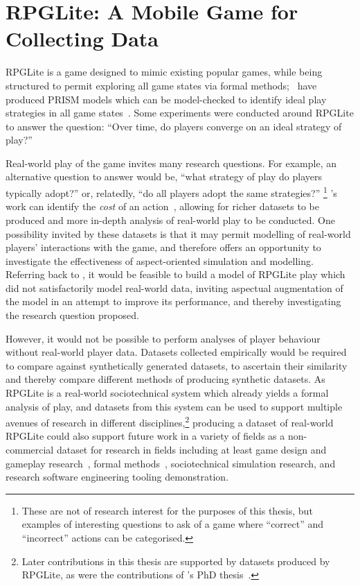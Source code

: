 \chapter{RPGLite: A Mobile Game for Collecting Data}

RPGLite is a game designed to mimic existing popular games, while being
structured to permit exploring all game states via formal methods;
\citeauthor{kavanagh2020}~have produced PRISM models which can be model-checked
to identify ideal play strategies in all game states~\cite{kavanagh2020}. Some
experiments were conducted around RPGLite to answer the question: ``Over time,
do players converge on an ideal strategy of play?''

Real-world play of the game invites many research questions. For example, an
alternative question to answer would be, ``what strategy of play do players
typically adopt?'' or, relatedly, ``do all players adopt the same strategies?''
\footnote{These are not of research interest for the purposes of this thesis,
but examples of interesting questions to ask of a game where ``correct'' and
``incorrect'' actions can be categorised.} \citeauthor{kavanagh2020}'s work can
identify the \emph{cost} of an action~\cite{kavanagh2020,kavanagh2021thesis},
allowing for richer datasets to be produced and more in-depth analysis of
real-world play to be conducted. One possibility invited by these datasets is
that it may permit modelling of real-world players' interactions with the game,
and therefore offers an opportunity to investigate the effectiveness of
aspect-oriented simulation and modelling. Referring back to , it would be feasible to build a model of RPGLite play
which did not satisfactorily model real-world data, inviting aspectual
augmentation of the model in an attempt to improve its performance, and thereby
investigating the research question proposed.

However, it would not be possible to perform analyses of player behaviour
without real-world player data. Datasets collected empirically would be required
to compare against synthetically generated datasets, to ascertain their
similarity and thereby compare different methods of producing synthetic
datasets. As RPGLite is a real-world sociotechnical system which already yields
a formal analysis of play, and datasets from this system can be used to support
multiple avenues of research in different disciplines,\footnote{Later
contributions in this thesis are supported by datasets produced by RPGLite, as
were the contributions of \citeauthor{kavanagh2021thesis}'s PhD
thesis~\cite{kavanagh2021thesis}.} producing a dataset of real-world RPGLite
could also support future work in a variety of fields as a non-commercial
dataset for research in fields including at least game design and gameplay
research~\cite{kavanagh2021thesis}, formal methods~\cite{kavanagh2020},
sociotechnical simulation research, and research software engineering tooling
demonstration.

